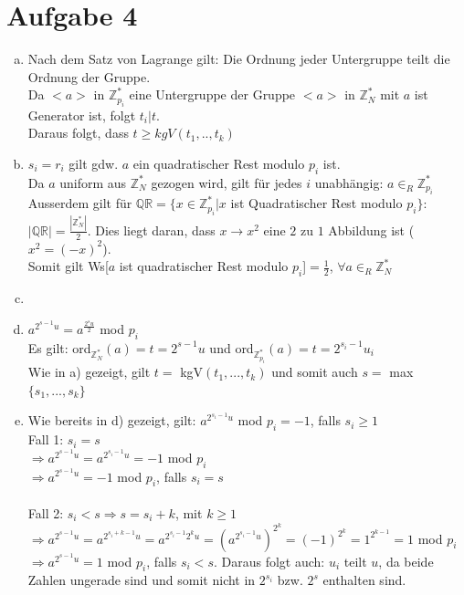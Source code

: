 \documentclass[a4paper]{scrartcl}
\begin{document}
\section*{Aufgabe 4}
\begin{enumerate}[a)]
\item Nach dem Satz von Lagrange gilt: Die Ordnung jeder Untergruppe teilt die Ordnung der Gruppe.\\
Da $<a>$ in $\mathbb{Z}_{p_i}^*$ eine Untergruppe der Gruppe $<a>$ in $\mathbb{Z}_N^*$ mit $a$ ist Generator ist, folgt $t_i | t$.\\
Daraus folgt, dass $t\geq kgV(t_1,..,t_k)$


\item $s_i = r_i$ gilt gdw. $a$ ein quadratischer Rest modulo $p_i$ ist.\\
 Da $a$ uniform aus $\mathbb{Z}_N^*$ gezogen wird, gilt für jedes $i$ unabhängig: $a\in_R\mathbb{Z}_{p_i}^*$\\
Ausserdem gilt für $\mathbb{QR}=\{x\in \mathbb{Z}_{p_i}^*|x$ ist Quadratischer Rest modulo $p_i\}$: $|\mathbb{QR}|=\frac{|\mathbb{Z}_N^*|}{2}$. Dies liegt daran, dass $x \rightarrow x^2$ eine $2$ zu $1$ Abbildung ist ($x^2=(-x)^2$).\\
Somit gilt Ws[$a$ ist quadratischer Rest modulo $p_i$]$=\frac{1}{2}$, $\forall a\in_R\mathbb{Z}_N^*$

\item 

\item $a^{2^{s-1}u}= a^{\frac{2^{s}u}{2}}$ mod $p_i$\\
Es gilt: ord$_{\mathbb{Z}_N^*}(a)=t=2^{s-1}u$ und ord$_{\mathbb{Z}_{p_i}^*}(a)=t=2^{s_i-1}u_i$\\
Wie in a) gezeigt, gilt $t=$ kgV$(t_1,...,t_k)$ und somit auch $s=$ max$\{s_1, ...,s_k\}$

\item Wie bereits in d) gezeigt, gilt: $a^{2^{s_i-1}u}$ mod $ p_i=-1$, falls $s_i\geq 1$\\
Fall 1: $s_i=s$\\
$\Rightarrow a^{2^{s-1}u} = a^{2^{s_i-1}u}=-1$ mod $p_i$\\
$\Rightarrow a^{2^{s-1}u} = -1$ mod $p_i$, falls $s_i=s$\\\\

Fall 2: $s_i < s \Rightarrow s = s_i+k$, mit $k\geq 1$\\
$\Rightarrow a^{2^{s-1}u} = a^{2^{s_i+k-1}u}=a^{2^{s_i-1}2^ku} = (a^{2^{s_i-1}u})^{2^k} = (-1)^{2^k} = 1^{2^{k-1}}= 1$ mod $p_i$\\
$\Rightarrow a^{2^{s-1}u} = 1$ mod $p_i$, falls $s_i<s$. Daraus folgt auch: $u_i$ teilt $u$, da beide Zahlen ungerade sind und somit nicht in $2^{s_i}$ bzw. $2^s$ enthalten sind.\\




\end{enumerate}
\end{document}
